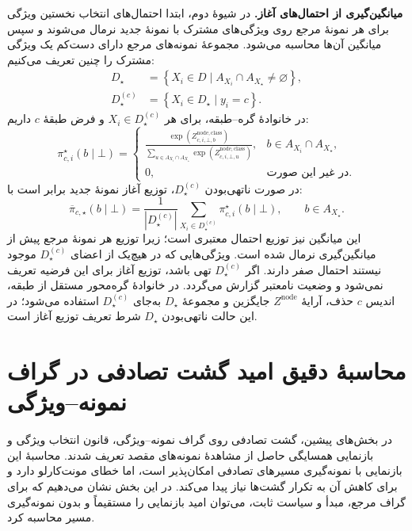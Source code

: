 \noindent\textbf{میانگین‌گیری از احتمال‌های آغاز.}
در شیوهٔ دوم، ابتدا احتمال‌های انتخاب نخستین ویژگی
برای هر نمونهٔ مرجع روی ویژگی‌های مشترک با نمونهٔ جدید
نرمال می‌شوند و سپس میانگین آن‌ها محاسبه می‌شود.
مجموعهٔ نمونه‌های مرجع دارای دست‌کم یک ویژگی مشترک را
چنین تعریف می‌کنیم:
\begin{equation}\label{cmp:eq:ch3-out-of-graph-overlap-set}
\boxed{\begin{aligned}
D_\star
&=\left\{X_i\in D\mid
A_{X_i}\cap A_{X_\star}\neq\varnothing\right\},\\
D_\star^{(c)}
&=\left\{X_i\in D_\star\mid y_i=c\right\}.
\end{aligned}}
\end{equation}
در خانوادهٔ گره--طبقه، برای هر
$X_i\in D_\star^{(c)}$ و فرض طبقهٔ $c$ داریم:
\begin{equation}\label{cmp:eq:ch3-out-of-graph-start-probability}
\pi_{c,i}^{\star}(b\mid\bot)=
\begin{cases}
\displaystyle
\frac{\exp(Z^{\mathrm{node,class}}_{c,i,\bot,b})}
{\sum\limits_{u\in A_{X_i}\cap A_{X_\star}}
\exp(Z^{\mathrm{node,class}}_{c,i,\bot,u})},
& b\in A_{X_i}\cap A_{X_\star},\\[8pt]
0,&\text{در غیر این صورت}.
\end{cases}
\end{equation}
در صورت ناتهی‌بودن $D_\star^{(c)}$،
توزیع آغاز نمونهٔ جدید برابر است با:
\begin{equation}\label{cmp:eq:ch3-out-of-graph-mean-start-probability}
\boxed{
\overline\pi_{c,\star}(b\mid\bot)
=
\frac{1}{|D_\star^{(c)}|}
\sum_{X_i\in D_\star^{(c)}}
\pi_{c,i}^{\star}(b\mid\bot),
\qquad b\in A_{X_\star}.
}
\end{equation}
این میانگین نیز توزیع احتمال معتبری است؛ زیرا
توزیع هر نمونهٔ مرجع پیش از میانگین‌گیری نرمال شده است.
ویژگی‌هایی که در هیچ‌یک از اعضای
$D_\star^{(c)}$ موجود نیستند احتمال صفر دارند.
اگر $D_\star^{(c)}$ تهی باشد، توزیع آغاز برای
این فرضیه تعریف نمی‌شود و وضعیت نامعتبر گزارش
می‌گردد. در خانوادهٔ گره‌محور مستقل از طبقه،
اندیس $c$ حذف، آرایهٔ $Z^{\mathrm{node}}$
جایگزین و مجموعهٔ $D_\star$ به‌جای
$D_\star^{(c)}$ استفاده می‌شود؛ در این حالت
ناتهی‌بودن $D_\star$ شرط تعریف توزیع آغاز است.

\section{محاسبهٔ دقیق امید گشت تصادفی در گراف نمونه--ویژگی}
\label{cmp:sec:ch3-exact-walk-calculation}
در بخش‌های پیشین، گشت تصادفی روی گراف نمونه--ویژگی،
قانون انتخاب ویژگی و بازنمایی همسایگی حاصل از مشاهدهٔ
نمونه‌های مقصد تعریف شدند. محاسبهٔ این بازنمایی با
نمونه‌گیری مسیرهای تصادفی امکان‌پذیر است، اما خطای
مونت‌کارلو دارد و برای کاهش آن به تکرار گشت‌ها
نیاز پیدا می‌کند. در این بخش نشان می‌دهیم که
برای گراف مرجع، مبدأ و سیاست ثابت، می‌توان امید
بازنمایی را مستقیماً و بدون نمونه‌گیری مسیر
محاسبه کرد.

